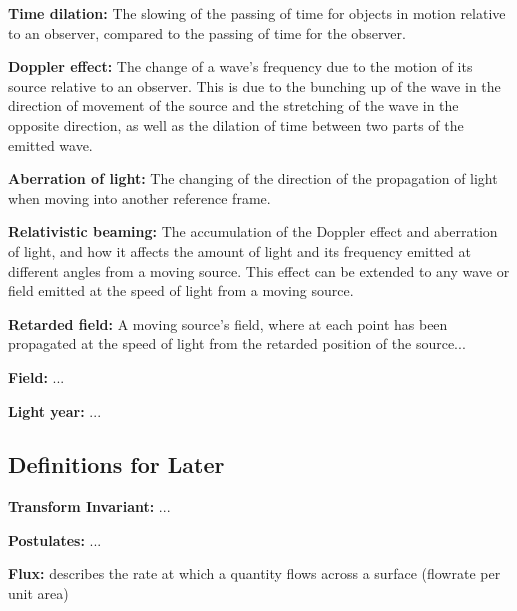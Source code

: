 \noindent \hypertarget{def-time-dilation}{\textbf{Time dilation:}}
The slowing of the passing of time for objects in motion relative to an observer, compared to the passing of time for the observer.

\noindent \hypertarget{def-doppler-effect}{\textbf{Doppler effect:}}
The change of a wave's frequency due to the motion of its source relative to an observer. This is due to the bunching up of the wave in the direction of movement of the source and the stretching of the wave in the opposite direction, as well as the dilation of time between two parts of the emitted wave.

\noindent \hypertarget{def-aberration}{\textbf{Aberration of light:}}
The changing of the direction of the propagation of light when moving into another reference frame.

\noindent \hypertarget{def-relativistic-beaming}{\textbf{Relativistic beaming:}}
The accumulation of the Doppler effect and aberration of light, and how it affects the amount of light and its frequency emitted at different angles from a moving source. This effect can be extended to any wave or field emitted at the speed of light from a moving source.

\noindent \hypertarget{def-retarded-field}{\textbf{Retarded field:}}
A moving source's field, where at each point has been propagated at the speed of light from the retarded position of the source...

\noindent \hypertarget{def-field}{\textbf{Field:}}
...

\noindent \hypertarget{def-light-year}{\textbf{Light year:}}
...

\subsection{Definitions for Later}%

\noindent \hypertarget{def-lorentz-invariant}{\textbf{Transform Invariant:}}
...

\noindent \hypertarget{def-postulates}{\textbf{Postulates:}}
...

\noindent \hypertarget{def-flux}{\textbf{Flux:}}
describes the rate at which a quantity flows across a surface (flowrate per unit area)